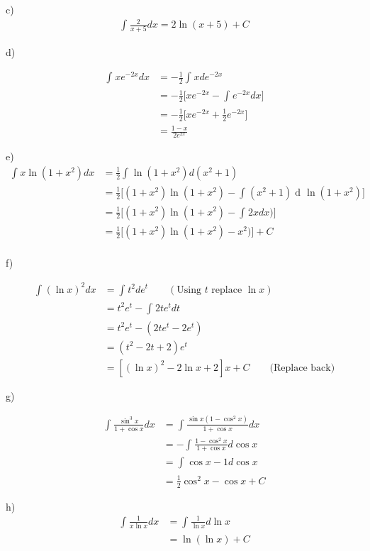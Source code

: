 \documentclass[letterpaper, 11pt]{article}
\newcommand{\1}{\mathds{1}}	%
\DeclareMathOperator*{\dv}{d\!}           %
\theoremstyle{definition}
\begin{document}
c)
\begin{align*}
  \int_{}^{}\frac{2}{x + 5} dx = 2\ln (x+5) + C
\end{align*}

d)

\begin{align*}
  \int_{}^{}xe ^{-2x}dx &= -\frac{1}{2}\int_{}^{}x de ^{-2x} \\
  &= -\frac{1}{2}\Big[xe ^{-2x} - \int_{}^{}e ^{-2x}dx\Big] \\
  &=-\frac{1}{2}\Big[xe ^{-2x} + \frac{1}{2}e ^{-2x}\Big] \\
  &= \frac{1-x}{2e ^{2x}}
\end{align*}

e)
\begin{align*}
  \int_{}^{}x \ln(1+x ^{2}) dx &=\frac{1}{2} \int_{}^{}\ln(1+x ^{2}) d(x ^{2}+1) \\
  &= \frac{1}{2}\Big[(1+x ^{2})\ln(1+x ^{2}) - \int_{}^{}(x ^{2} + 1)\dv \ln(1+x ^{2})\Big] \\
  &=\frac{1}{2}\Big[(1+x ^{2})\ln(1+x ^{2}) - \int_{}^{} 2x
  dx)\Big] \\
  &=\frac{1}{2}\Big[(1+x ^{2})\ln(1+x ^{2}) - x ^{2})\Big] + C\\
\end{align*}


f)

\begin{align*}
  \int_{}^{}(\ln x)^{2}dx &= \int_{}^{}t ^{2}de ^{t} \qquad (\text{Using $t$ replace $\ln x$}) \\
  &=t ^{2}e ^{t} - \int_{}^{}2te ^{t}dt \\
  &=t ^{2}e ^{t} - (2te ^{t} - 2e ^{t}) \\
  &=(t ^{2}-2t+2)e ^{t} \\
  &= [(\ln x)^{2}-2 \ln x + 2]x + C \qquad \text{(Replace back)}
\end{align*}

g)

\begin{align*}
  \int_{}^{}\frac{\sin ^{3}x}{1+ \cos x}dx &= \int_{}^{}\frac{\sin x (1- \cos ^{2}x)}{1+\cos x}dx \\
  &= -\int_{}^{}\frac{1-\cos ^{2} x}{1+ \cos x} d \cos x \\
  &= \int_{}^{}\cos x - 1 d \cos x \\
  &= \frac{1}{2}\cos ^{2} x - \cos x + C
\end{align*}


h)
\begin{align*}
  \int_{}^{}\frac{1}{x \ln x}dx &= \int_{}^{}\frac{1}{\ln x}d \ln x \\
  &=\ln(\ln x) +C
\end{align*}
\end{document}
